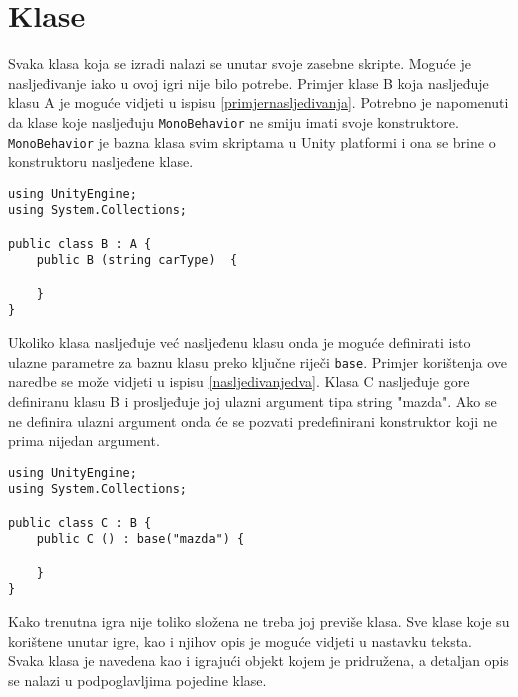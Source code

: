 \section{Klase}
Svaka klasa koja se izradi nalazi se unutar svoje zasebne skripte. Moguće je nasljeđivanje iako u ovoj igri nije bilo potrebe. Primjer klase B koja nasljeđuje klasu A je moguće vidjeti u ispisu \ref{primjernasljedivanja}. Potrebno je napomenuti da klase koje nasljeđuju \texttt{MonoBehavior} ne smiju imati svoje konstruktore. \texttt{MonoBehavior} je bazna klasa svim skriptama u Unity platformi i ona se brine o konstruktoru nasljeđene klase.
\begin{lstlisting}[caption={Primjer nasljeđivanja}, label=primjernasljedivanja]
using UnityEngine;
using System.Collections;

public class B : A {
	public B (string carType)  {
	
	}	
}
\end{lstlisting}
Ukoliko klasa nasljeđuje već nasljeđenu klasu onda je moguće definirati isto ulazne parametre za baznu klasu preko ključne riječi \texttt{base}. Primjer korištenja ove naredbe se može vidjeti u ispisu \ref{nasljedivanjedva}. Klasa C nasljeđuje gore definiranu klasu B i prosljeđuje joj ulazni argument tipa string "mazda". Ako se ne definira ulazni argument onda će se pozvati predefinirani konstruktor koji ne prima nijedan argument.

\begin{lstlisting}[caption={Primjer nasljeđivanja nasljeđene klase}, label=nasljedivanjedva]
using UnityEngine;
using System.Collections;

public class C : B {
	public C () : base("mazda") {
	
	}	
}
\end{lstlisting}

Kako trenutna igra nije toliko složena ne treba joj previše klasa. Sve klase koje su korištene unutar igre, kao i njihov opis je moguće vidjeti u nastavku teksta. Svaka klasa je navedena kao i igrajući objekt kojem je pridružena, a detaljan opis se nalazi u podpoglavljima pojedine klase.
\newpage

